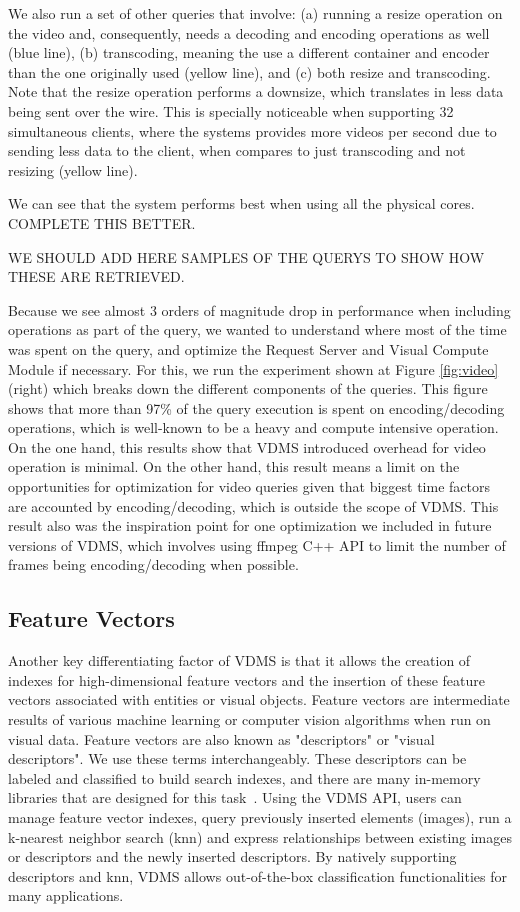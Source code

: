 We also run a set of other queries that involve: (a) running a resize operation
on the video and, consequently, needs a decoding and
encoding operations as well (blue line),
(b) transcoding, meaning the use a different container and encoder
than the one originally used (yellow line), and (c) both resize and transcoding.
Note that the resize operation performs a downsize, which translates in less
data being sent over the wire. This is specially noticeable when supporting 32
simultaneous clients, where the systems provides more videos per second due to
sending less data to the client, when compares to just transcoding and not resizing (yellow line).

We can see that the system performs best when using all the physical cores.
COMPLETE THIS BETTER.

WE SHOULD ADD HERE SAMPLES OF THE QUERYS TO SHOW HOW THESE ARE RETRIEVED.

Because we see almost 3 orders of magnitude drop in performance when including
operations as part of the query, we wanted to understand where most of the time
was spent on the query, and optimize the Request Server and Visual Compute Module
if necessary. For this, we run the experiment shown at
Figure \ref{fig:video} (right) which breaks down the different components of the
queries. This figure shows that more than 97\% of the query execution is spent
on encoding/decoding operations, which is well-known to be a
heavy and compute intensive operation.
On the one hand, this results show that VDMS introduced overhead for
video operation is minimal. On the other hand, this result means a
limit on the opportunities for optimization for video queries given
that biggest time factors are accounted by encoding/decoding, which is
outside the scope of VDMS.
This result also was the inspiration point for one optimization we included
in future versions of VDMS, which involves using ffmpeg C++ API to
limit the number of frames being encoding/decoding when possible.


\subsection{Feature Vectors}

Another key differentiating factor of VDMS is that it allows the creation of
indexes for high-dimensional feature vectors and the insertion of
these feature vectors associated with entities or visual objects.
Feature vectors are intermediate results of various machine
learning or computer vision algorithms when run on visual data.
Feature vectors are also known as "descriptors" or "visual descriptors".
We use these terms interchangeably.
These descriptors can be labeled and classified to build search indexes,
and there are many in-memory libraries that are designed for
this task~\cite{flann, faiss}.
Using the VDMS API, users can manage feature vector indexes,
query previously inserted elements (images),
run a k-nearest neighbor search (knn) and express relationships
between existing images or descriptors and
the newly inserted descriptors.
By natively supporting descriptors and knn,
VDMS allows out-of-the-box classification
functionalities for many applications.

